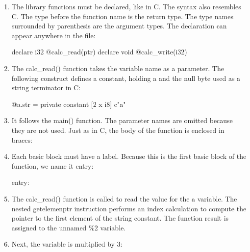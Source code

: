 \begin{enumerate}
\item
The library functions must be declared, like in C. The syntax also resembles C. The type before the function name is the return type.   The type names surrounded by parenthesis are the argument types. The declaration can appear anywhere in the file:

\begin{shell}
declare i32 @calc_read(ptr)
declare void @calc_write(i32)
\end{shell}

\item
The calc\_read() function takes the variable name as a parameter. The following construct defines a constant, holding a and the null byte used as a string terminator in C:

\begin{shell}
@a.str = private constant [2 x i8] c"a"
\end{shell}

\item
It follows the main() function. The parameter names are omitted because they are not used. Just as in C, the body of the function is enclosed in braces:

\begin{shell}
define i32 @main(i32, ptr) {
\end{shell}

\item
Each basic block must have a label. Because this is the first basic block of the function, we name it entry:

\begin{shell}
entry:
\end{shell}

\item
The calc\_read() function is called to read the value for the a variable. The nested getelemenptr instruction performs an index calculation to compute the pointer to the first element of the string constant. The function result is assigned to the unnamed \%2 variable.

\begin{shell}
\end{shell}

\item
Next, the variable is multiplied by 3:

\begin{shell}
\end{shell}


\end{enumerate}

